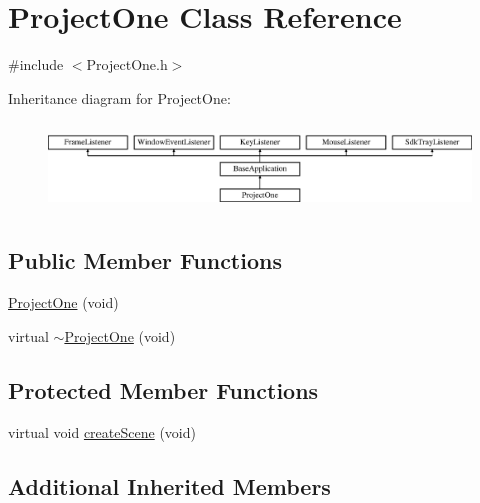 \hypertarget{class_project_one}{\section{Project\-One Class Reference}
\label{class_project_one}
}


{\ttfamily \#include $<$Project\-One.\-h$>$}

Inheritance diagram for Project\-One\-:\begin{figure}[H]
\begin{center}
\leavevmode
\includegraphics[height=2.382979cm]{class_project_one}
\end{center}
\end{figure}
\subsection*{Public Member Functions}
\begin{DoxyCompactItemize}
\item 
\hyperlink{class_project_one_ac93fc059b5fc7afe41bbaae53b226736}{Project\-One} (void)
\item 
virtual \hyperlink{class_project_one_a337e981319ab327d670bc37d4fa3f7c2}{$\sim$\-Project\-One} (void)
\end{DoxyCompactItemize}
\subsection*{Protected Member Functions}
\begin{DoxyCompactItemize}
\item 
virtual void \hyperlink{class_project_one_a61b71d677e7e4e3ac80071431b65ca5c}{create\-Scene} (void)
\end{DoxyCompactItemize}
\subsection*{Additional Inherited Members}


